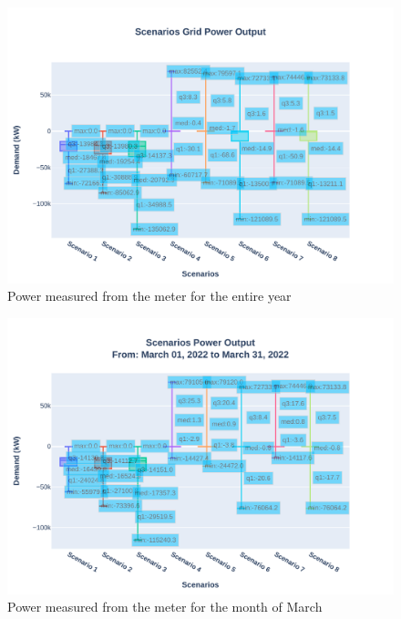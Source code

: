\documentclass[conference]{IEEEtran}
\begin{document}
	\begin{figure}[H]
		\centering
		\includegraphics[width=1\linewidth]{Fig/Option_3/scenarios_power_output_boxplot}
		\caption{Power measured from the meter for the entire year}
		\label{fig:scenariospoweroutputboxplot}
	\end{figure}
	\begin{figure}[H]
		\centering
		\includegraphics[width=1\linewidth]{Fig/Option_3/0_Scn_Output_Run_3_Mar_01_2022_to_Mar_31_2022}
		\caption{\footnotesize  Power measured from the meter for the month of March}
		\label{fig:0scnoutputrun2mar012022tomar312022}
	\end{figure}
\end{document}
